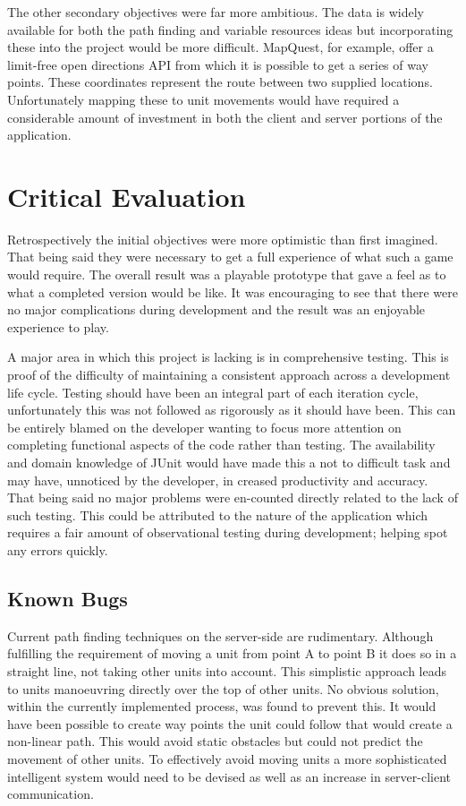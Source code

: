 The other secondary objectives were far more ambitious. The data is widely available for both the path finding and variable resources ideas but incorporating these into the project would be more difficult. MapQuest, for example, offer a limit-free open directions API\cite{mapquest_directions} from which it is possible to get a series of way points. These coordinates represent the route between two supplied locations. Unfortunately mapping these to unit movements would have required a considerable amount of investment in both the client and server portions of the application. 

\section{Critical Evaluation}
Retrospectively the initial objectives were more optimistic than first imagined. That being said they were necessary to get a full experience of what such a game would require. The overall result was a playable prototype that gave a feel as to what a completed version would be like. It was encouraging to see that there were no major complications during development and the result was an enjoyable experience to play.

A major area in which this project is lacking is in comprehensive testing. This is proof of the difficulty of maintaining a consistent approach across a development life cycle. Testing should have been an integral part of each iteration cycle, unfortunately this was not followed as rigorously as it should have been. This can be entirely blamed on the developer wanting to focus more attention on completing functional aspects of the code rather than testing. The availability and domain knowledge of JUnit would have made this a not to difficult task and may have, unnoticed by the developer, in creased productivity and accuracy. That being said no major problems were en-counted directly related to the lack of such testing. This could be attributed to the nature of the application which requires a fair amount of observational testing during development; helping spot any errors quickly.


\subsection{Known Bugs}
Current path finding techniques on the server-side are rudimentary. Although fulfilling the requirement of moving a unit from point A to point B it does so in a straight line, not taking other units into account. This simplistic approach leads to units manoeuvring directly over the top of other units. No obvious solution, within the currently implemented process, was found to prevent this. It would have been possible to create way points the unit could follow that would create a non-linear path. This would avoid static obstacles but could not predict the movement of other units. To effectively avoid moving units a more sophisticated intelligent system would need to be devised as well as an increase in server-client communication.

